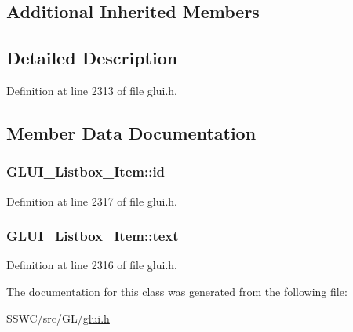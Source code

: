 \subsection*{Additional Inherited Members}


\subsection{Detailed Description}


Definition at line 2313 of file glui.\+h.



\subsection{Member Data Documentation}
\hypertarget{class_g_l_u_i___listbox___item_a82c3decf8704010c91232ad6e2ea95d9}{
\subsubsection[{id}]{ G\+L\+U\+I\+\_\+\+Listbox\+\_\+\+Item\+::id}}\label{class_g_l_u_i___listbox___item_a82c3decf8704010c91232ad6e2ea95d9}


Definition at line 2317 of file glui.\+h.

\hypertarget{class_g_l_u_i___listbox___item_a93ab7eacdaf81a43b07b89e60bc5edbe}{
\subsubsection[{text}]{ G\+L\+U\+I\+\_\+\+Listbox\+\_\+\+Item\+::text}}\label{class_g_l_u_i___listbox___item_a93ab7eacdaf81a43b07b89e60bc5edbe}


Definition at line 2316 of file glui.\+h.



The documentation for this class was generated from the following file\+:\begin{DoxyCompactItemize}
\item 
S\+S\+W\+C/src/\+G\+L/\hyperlink{glui_8h}{glui.\+h}\end{DoxyCompactItemize}
